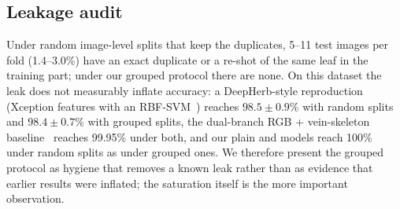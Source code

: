 \subsection{Leakage audit}
\label{sec:leak}
Under random image-level splits that keep the duplicates, 5--11 test images per fold (1.4--3.0\%) have
an exact duplicate or a re-shot of the same leaf in the training part; under our grouped protocol
there are none. On this dataset the leak does not measurably inflate accuracy: a DeepHerb-style
reproduction (Xception features with an RBF-SVM~\citep{roopashree2021deepherb}) reaches
$98.5\pm0.9\%$ with random splits and $98.4\pm0.7\%$ with grouped splits, the dual-branch RGB +
vein-skeleton baseline~\citep{dualbranch2026} reaches 99.95\% under both, and our plain and \SVA{}
models reach 100\% under random splits as under grouped ones. We therefore present the grouped protocol
as hygiene that removes a known leak rather than as evidence that earlier results were inflated; the
saturation itself is the more important observation.
